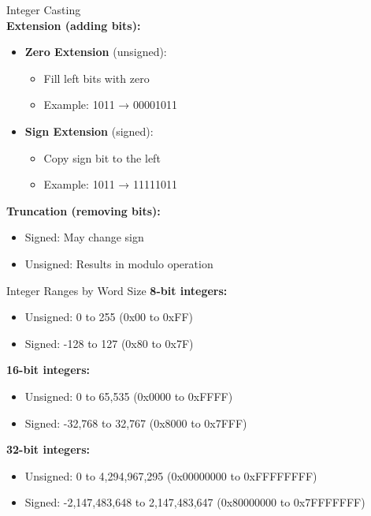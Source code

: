 \begin{definition}{Integer Casting}\\
\textbf{Extension (adding bits):}
\begin{itemize}
  \item \textbf{Zero Extension} (unsigned):
    \begin{itemize}
      \item Fill left bits with zero
      \item Example: 1011 → 00001011
    \end{itemize}
  \item \textbf{Sign Extension} (signed):
    \begin{itemize}
      \item Copy sign bit to the left
      \item Example: 1011 → 11111011
    \end{itemize}
\end{itemize}

\textbf{Truncation (removing bits):}
\begin{itemize}
  \item Signed: May change sign
  \item Unsigned: Results in modulo operation
\end{itemize}
\end{definition}

\begin{example2}{Integer Ranges by Word Size}
\textbf{8-bit integers:}
\begin{itemize}
  \item Unsigned: 0 to 255 (0x00 to 0xFF)
  \item Signed: -128 to 127 (0x80 to 0x7F)
\end{itemize}

\textbf{16-bit integers:}
\begin{itemize}
  \item Unsigned: 0 to 65,535 (0x0000 to 0xFFFF)
  \item Signed: -32,768 to 32,767 (0x8000 to 0x7FFF)
\end{itemize}

\textbf{32-bit integers:}
\begin{itemize}
  \item Unsigned: 0 to 4,294,967,295 (0x00000000 to 0xFFFFFFFF)
  \item Signed: -2,147,483,648 to 2,147,483,647 (0x80000000 to 0x7FFFFFFF)
\end{itemize}
\end{example2}

